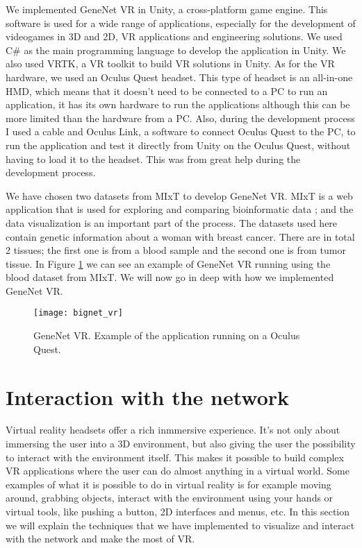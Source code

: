 We implemented GeneNet VR in Unity, a cross-platform game engine. This software is used for a wide range of applications, especially for the development of videogames in 3D and 2D, VR applications and engineering solutions. We used C\# as the main programming language to develop the application in Unity. We also used VRTK, a VR toolkit to build VR solutions in Unity. As for the VR hardware, we used an Oculus Quest headset. This type of headset is an all-in-one HMD, which means that it doesn't need to be connected to a PC to run an application, it has its own hardware to run the applications although this can be more limited than the hardware from a PC. Also, during the development process I used a cable and Oculus Link, a software to connect Oculus Quest to the PC, to run the application and test it directly from Unity on the Oculus Quest, without having to load it to the headset. This was from great help during the development process.

We have chosen two datasets from MIxT to develop GeneNet VR. MIxT is a web application that is used for exploring and comparing bioinformatic data  \cite{fjukstad_dumeaux_olsen_lund_hallett_bongo_2017}  \cite{dumeaux_fjukstad_interactions_tumor_blood}; and the data visualization is an important part of the process. The datasets used here contain genetic information about a woman with breast cancer. There are in total 2 tissues; the first one is from a blood sample and the second one is from tumor tissue. In Figure \ref{fig:bignet_vr} we can see an example of GeneNet VR running using the blood dataset from MIxT. We will now go in deep with how we implemented GeneNet VR.

\begin{figure}[h!]
    \centering
    \texttt{[image: bignet\_vr]}
    \caption{GeneNet VR. Example of the application running on a Oculus Quest.}
    \label{fig:bignet_vr}
\end{figure}

\section{Interaction with the network}
Virtual reality headsets offer a rich inmmersive experience. It's not only about immersing the user into a 3D environment, but also giving the user the possibility to interact with the environment itself. This makes it possible to build complex VR applications where the user can do almost anything in a virtual world. Some examples of what it is possible to do in virtual reality is for example moving around, grabbing objects, interact with the environment using your hands or virtual tools, like pushing a button, 2D interfaces and menus, etc. In this section we will explain the techniques that we have implemented to visualize and interact with the network and make the most of VR.


